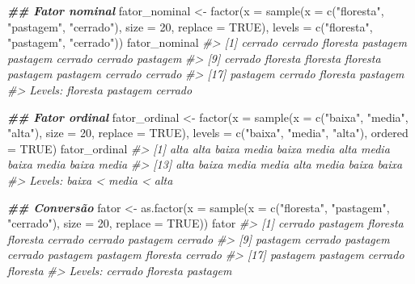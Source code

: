 \documentclass[
]{book}
\newenvironment{Shaded}{\begin{snugshade}}{\end{snugshade}}
\newcommand{\AttributeTok}[1]{\textcolor[rgb]{0.61,0.61,0.61}{#1}}
\newcommand{\CommentTok}[1]{\textcolor[rgb]{0.37,0.37,0.37}{\textit{#1}}}
\newcommand{\ConstantTok}[1]{\textcolor[rgb]{0,0,0}{#1}}
\newcommand{\DecValTok}[1]{\textcolor[rgb]{0.06,0.06,0.06}{#1}}
\newcommand{\DocumentationTok}[1]{\textcolor[rgb]{0.37,0.37,0.37}{\textbf{\textit{#1}}}}
\newcommand{\FunctionTok}[1]{\textcolor[rgb]{0,0,0}{#1}}
\newcommand{\NormalTok}[1]{#1}
\newcommand{\OtherTok}[1]{\textcolor[rgb]{0.37,0.37,0.37}{#1}}
\newcommand{\StringTok}[1]{\textcolor[rgb]{0.5,0.5,0.5}{#1}}
\begin{document}
\begin{Shaded}
\begin{Highlighting}[]
\DocumentationTok{\#\# Fator nominal}
\NormalTok{fator\_nominal }\OtherTok{\textless{}{-}} \FunctionTok{factor}\NormalTok{(}\AttributeTok{x =} \FunctionTok{sample}\NormalTok{(}\AttributeTok{x =} \FunctionTok{c}\NormalTok{(}\StringTok{"floresta"}\NormalTok{, }\StringTok{"pastagem"}\NormalTok{, }\StringTok{"cerrado"}\NormalTok{), }
                                   \AttributeTok{size =} \DecValTok{20}\NormalTok{, }\AttributeTok{replace =} \ConstantTok{TRUE}\NormalTok{),}
                        \AttributeTok{levels =} \FunctionTok{c}\NormalTok{(}\StringTok{"floresta"}\NormalTok{, }\StringTok{"pastagem"}\NormalTok{, }\StringTok{"cerrado"}\NormalTok{))}
\NormalTok{fator\_nominal}
\CommentTok{\#\textgreater{}  [1] cerrado  cerrado  floresta pastagem pastagem cerrado  cerrado  pastagem}
\CommentTok{\#\textgreater{}  [9] cerrado  floresta floresta floresta pastagem pastagem cerrado  cerrado }
\CommentTok{\#\textgreater{} [17] pastagem cerrado  floresta pastagem}
\CommentTok{\#\textgreater{} Levels: floresta pastagem cerrado}

\DocumentationTok{\#\# Fator ordinal}
\NormalTok{fator\_ordinal }\OtherTok{\textless{}{-}} \FunctionTok{factor}\NormalTok{(}\AttributeTok{x =} \FunctionTok{sample}\NormalTok{(}\AttributeTok{x =} \FunctionTok{c}\NormalTok{(}\StringTok{"baixa"}\NormalTok{, }\StringTok{"media"}\NormalTok{, }\StringTok{"alta"}\NormalTok{), }
                                   \AttributeTok{size =} \DecValTok{20}\NormalTok{, }\AttributeTok{replace =} \ConstantTok{TRUE}\NormalTok{),}
                        \AttributeTok{levels =} \FunctionTok{c}\NormalTok{(}\StringTok{"baixa"}\NormalTok{, }\StringTok{"media"}\NormalTok{, }\StringTok{"alta"}\NormalTok{), }\AttributeTok{ordered =} \ConstantTok{TRUE}\NormalTok{)}
\NormalTok{fator\_ordinal}
\CommentTok{\#\textgreater{}  [1] alta  alta  baixa media baixa media alta  media baixa media baixa media}
\CommentTok{\#\textgreater{} [13] alta  baixa media media alta  media baixa baixa}
\CommentTok{\#\textgreater{} Levels: baixa \textless{} media \textless{} alta}

\DocumentationTok{\#\# Conversão}
\NormalTok{fator }\OtherTok{\textless{}{-}} \FunctionTok{as.factor}\NormalTok{(}\AttributeTok{x =} \FunctionTok{sample}\NormalTok{(}\AttributeTok{x =} \FunctionTok{c}\NormalTok{(}\StringTok{"floresta"}\NormalTok{, }\StringTok{"pastagem"}\NormalTok{, }\StringTok{"cerrado"}\NormalTok{), }
                              \AttributeTok{size =} \DecValTok{20}\NormalTok{, }\AttributeTok{replace =} \ConstantTok{TRUE}\NormalTok{))}
\NormalTok{fator}
\CommentTok{\#\textgreater{}  [1] cerrado  pastagem floresta floresta cerrado  cerrado  pastagem cerrado }
\CommentTok{\#\textgreater{}  [9] pastagem cerrado  pastagem cerrado  pastagem pastagem floresta cerrado }
\CommentTok{\#\textgreater{} [17] pastagem pastagem cerrado  floresta}
\CommentTok{\#\textgreater{} Levels: cerrado floresta pastagem}
\end{Highlighting}
\end{Shaded}
\end{document}
